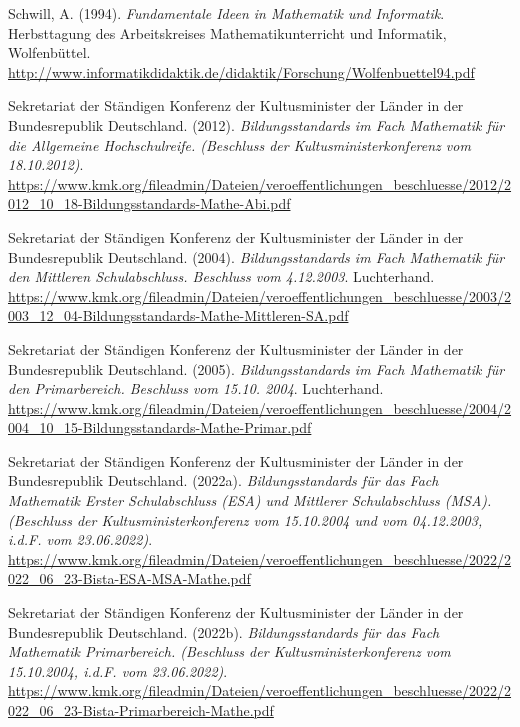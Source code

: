 \documentclass[
]{scrbook}
\newlength{\cslhangindent}
\newlength{\cslentryspacingunit} %
\newenvironment{CSLReferences}[2] %
 {%
  \setlength{\parindent}{0pt}
  \ifodd #1
  \let\oldpar\par
  \def\par{\hangindent=\cslhangindent\oldpar}
  \fi
  \setlength{\parskip}{#2\cslentryspacingunit}
 }%
 {}
\theoremstyle{definition}
\theoremstyle{definition}
\theoremstyle{definition}
\theoremstyle{definition}
\theoremstyle{remark}
\begin{document}
\begin{CSLReferences}{1}{0}
\leavevmode{}%
Schwill, A. (1994). \emph{Fundamentale {Ideen} in {Mathematik} und {Informatik}}. Herbsttagung des Arbeitskreises Mathematikunterricht und Informatik, Wolfenbüttel. \url{http://www.informatikdidaktik.de/didaktik/Forschung/Wolfenbuettel94.pdf}

\leavevmode{}%
Sekretariat der Ständigen Konferenz der Kultusminister der Länder in der Bundesrepublik Deutschland. (2012). \emph{Bildungsstandards im {Fach} {Mathematik} für die {Allgemeine} {Hochschulreife}. (Beschluss der Kultusministerkonferenz vom 18.10.2012)}. \url{https://www.kmk.org/fileadmin/Dateien/veroeffentlichungen_beschluesse/2012/2012_10_18-Bildungsstandards-Mathe-Abi.pdf}

\leavevmode{}%
Sekretariat der Ständigen Konferenz der Kultusminister der Länder in der Bundesrepublik Deutschland. (2004). \emph{Bildungsstandards im {Fach} {Mathematik} für den {Mittleren} {Schulabschluss}. {Beschluss} vom 4.12.2003}. Luchterhand. \url{https://www.kmk.org/fileadmin/Dateien/veroeffentlichungen_beschluesse/2003/2003_12_04-Bildungsstandards-Mathe-Mittleren-SA.pdf}

\leavevmode{}%
Sekretariat der Ständigen Konferenz der Kultusminister der Länder in der Bundesrepublik Deutschland. (2005). \emph{Bildungsstandards im {Fach} {Mathematik} für den {Primarbereich}. {Beschluss} vom 15.10. 2004}. Luchterhand. \url{https://www.kmk.org/fileadmin/Dateien/veroeffentlichungen_beschluesse/2004/2004_10_15-Bildungsstandards-Mathe-Primar.pdf}

\leavevmode{}%
Sekretariat der Ständigen Konferenz der Kultusminister der Länder in der Bundesrepublik Deutschland. (2022a). \emph{Bildungsstandards für das {Fach} {Mathematik} {Erster} {Schulabschluss} ({ESA}) und {Mittlerer} {Schulabschluss} ({MSA}). ({Beschluss} der {Kultusministerkonferenz} vom 15.10.2004 und vom 04.12.2003, i.d.{F}. vom 23.06.2022)}. \url{https://www.kmk.org/fileadmin/Dateien/veroeffentlichungen_beschluesse/2022/2022_06_23-Bista-ESA-MSA-Mathe.pdf}

\leavevmode{}%
Sekretariat der Ständigen Konferenz der Kultusminister der Länder in der Bundesrepublik Deutschland. (2022b). \emph{Bildungsstandards für das {Fach} {Mathematik} {Primarbereich}. ({Beschluss} der {Kultusministerkonferenz} vom 15.10.2004, i.d.{F}. vom 23.06.2022)}. \url{https://www.kmk.org/fileadmin/Dateien/veroeffentlichungen_beschluesse/2022/2022_06_23-Bista-Primarbereich-Mathe.pdf}


\end{CSLReferences}
\end{document}
